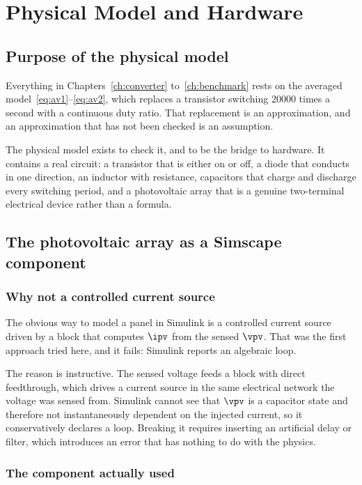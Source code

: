 \chapter{Physical Model and Hardware}
\label{ch:physical}

\section{Purpose of the physical model}

Everything in Chapters~\ref{ch:converter} to~\ref{ch:benchmark} rests on the
averaged model~\eqref{eq:av1}--\eqref{eq:av2}, which replaces a transistor
switching \num{20000} times a second with a continuous duty ratio. That
replacement is an approximation, and an approximation that has not been checked
is an assumption.

The physical model exists to check it, and to be the bridge to hardware. It
contains a real circuit: a transistor that is either on or off, a diode that
conducts in one direction, an inductor with resistance, capacitors that charge
and discharge every switching period, and a photovoltaic array that is a genuine
two-terminal electrical device rather than a formula.

\section{The photovoltaic array as a Simscape component}

\subsection{Why not a controlled current source}

The obvious way to model a panel in Simulink is a controlled current source
driven by a block that computes $\ipv$ from the sensed $\vpv$. That was the
first approach tried here, and it fails: Simulink reports an algebraic loop.

The reason is instructive. The sensed voltage feeds a block with direct
feedthrough, which drives a current source in the same electrical network the
voltage was sensed from. Simulink cannot see that $\vpv$ is a capacitor state
and therefore not instantaneously dependent on the injected current, so it
conservatively declares a loop. Breaking it requires inserting an artificial
delay or filter, which introduces an error that has nothing to do with the
physics.

\subsection{The component actually used}


